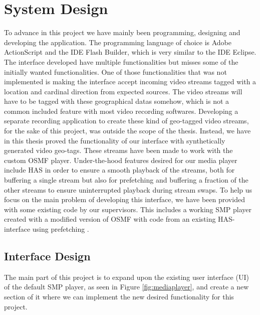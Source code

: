 \chapter{System Design}
\label{cha:sysdesign}

To advance in this project we have mainly been programming, designing and developing the application. The programming language of choice is Adobe ActionScript and the IDE Flash Builder, which is very similar to the IDE Eclipse. The interface developed have multiple functionalities but misses some of the initially wanted functionalities. One of those functionalities that was not implemented is making the interface accept incoming video streams tagged with a location and cardinal direction from expected sources. The video streams will have to be tagged with these geographical datas somehow, which is not a common included feature with most video recording softwares. Developing a separate recording application to create these kind of geo-tagged video streams, for the sake of this project, was outside the scope of the thesis. Instead, we have in this thesis proved the functionality of our interface with synthetically generated video geo-tags. These streams have been made to work with the custom OSMF player.  Under-the-hood features desired for our media player include HAS in order to ensure a smooth playback of the streams, both for buffering a single stream but also for prefetching and buffering a fraction of the other streams to ensure uninterrupted playback during stream swaps. To help us focus on the main problem of developing this interface, we have been provided with some existing code by our supervisors. This includes a working SMP player created with a modified version of OSMF with code from an existing HAS-interface using prefetching \cite{qualbranch}.

\section{Interface Design}
\label{sec:interfacedesign}

The main part of this project is to expand upon the existing user interface (UI) of the default SMP player, as seen in Figure \ref{fig:mediaplayer}, and create a new section of it where we can implement the new desired functionality for this project. 

